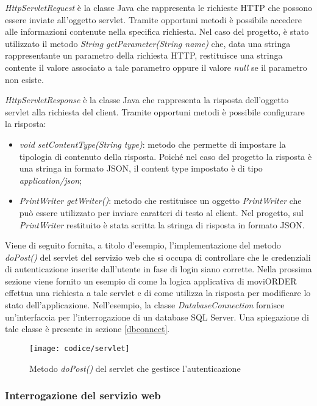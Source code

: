\textit{HttpServletRequest} è la classe Java che rappresenta le richieste HTTP che possono essere inviate all'oggetto servlet. Tramite opportuni metodi è possibile accedere alle informazioni contenute nella specifica richiesta. Nel caso del progetto, è stato utilizzato il metodo \textit{String getParameter(String name)} che, data una stringa rappresentante un parametro della richiesta HTTP, restituisce una stringa contente il valore associato a tale parametro oppure il valore \textit{null} se il parametro non esiste.

\textit{HttpServletResponse} è la classe Java che rappresenta la risposta dell'oggetto servlet alla richiesta del client. Tramite opportuni metodi è possibile configurare la risposta:
\begin{itemize}
	\item \textit{void setContentType(String type)}: metodo che permette di impostare la tipologia di contenuto della risposta. Poiché nel caso del progetto la risposta è una stringa in formato JSON, il content type impostato è di tipo \textit{application/json};
	\item \textit{PrintWriter getWriter()}: metodo che restituisce un oggetto \textit{PrintWriter} che può essere utilizzato per inviare caratteri di testo al client. Nel progetto, sul \textit{PrintWriter} restituito è stata scritta la stringa di risposta in formato JSON.
\end{itemize}

Viene di seguito fornita, a titolo d'esempio, l'implementazione del metodo \textit{doPost()} del servlet del servizio web che si occupa di controllare che le credenziali di autenticazione inserite dall'utente in fase di login siano corrette. Nella prossima sezione viene fornito un esempio di come la logica applicativa di moviORDER effettua una richiesta a tale servlet e di come utilizza la risposta per modificare lo stato dell'applicazione. Nell'esempio, la classe \textit{DatabaseConnection} fornisce un'interfaccia per l'interrogazione di un database SQL Server. Una spiegazione di tale classe è presente in sezione \ref{dbconnect}.

\begin{figure}[!h] 
    \centering 
    \texttt{[image: codice/servlet]} 
    \caption{Metodo \textit{doPost()} del servlet che gestisce l'autenticazione}
\end{figure}

\subsubsection{Interrogazione del servizio web}

